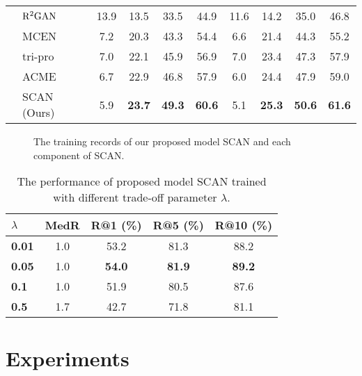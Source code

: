 \documentclass[journal]{IEEEtran}
\begin{document}
\begin{table*}[h!]
\begin{tabular}{clcccccccc}
    &$\rm {R^2 GAN}$ \cite{zhu2019r2gan} & 13.9 & 13.5 & 33.5 & 44.9 & 11.6 & 14.2 & 35.0 & 46.8 \\
    &MCEN \cite{fu2020mcen} & 7.2 & 20.3 & 43.3 & 54.4 & 6.6 & 21.4 & 44.3 & 55.2 \\
    &tri-pro \cite{zan2020sentence} & 7.0 & 22.1 & 45.9 & 56.9 & 7.0 & 23.4 & 47.3 & 57.9 \\
    &ACME \cite{wang2019learning} & 6.7 & 22.9 & 46.8 & 57.9 & 6.0 & 24.4 & 47.9 & 59.0 \\
    & SCAN (Ours) & 5.9 & \textbf{23.7} & \textbf{49.3} & \textbf{60.6} & 5.1 & \textbf{25.3} & \textbf{50.6} & \textbf{61.6}\\
    \bottomrule
  \end{tabular}
  \label{tab:results}
\end{table*}

\begin{figure*}[h!]
\begin{center}
\end{center}
\caption{The training records of our proposed model SCAN and each component of SCAN.}
\label{fig:training}
\end{figure*}

\begin{table}
  \centering
  \caption{The performance of proposed model SCAN trained with different trade-off parameter $\lambda$.}
    \begin{tabular}{lcccc}
    \toprule
    {$\lambda$} & \textbf{MedR} & \textbf{R@1 (\%)} & \textbf{R@5 (\%)} & \textbf{R@10 (\%)} \\
    \midrule
    \textbf{0.01} & 1.0 & 53.2 & 81.3  & 88.2 \\
    \textbf{0.05} & 1.0 & \textbf{54.0}  & \textbf{81.9}  & \textbf{89.2} \\
    \textbf{0.1} & 1.0 & 51.9  & 80.5  & 87.6 \\
    \textbf{0.5} & 1.7 & 42.7  & 71.8  & 81.1 \\
    \bottomrule
    \end{tabular}\label{tab:parameter}\end{table}

\section{Experiments}
\end{document}
